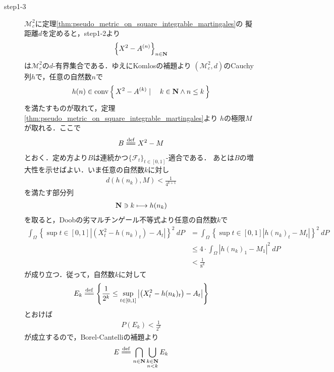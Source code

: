 \begin{sketch}
\begin{description}
			\item[step1-3]
				$\mathscr{M}_{c}^{2}$に定理\ref{thm:pseudo_metric_on_square_integrable_martingales}の
				擬距離$d$を定めると，step1-2より
				\begin{align}
					\left\{X^{2} - A^{(n)}\right\}_{n \in \mathbf{N}}
				\end{align}
				は$\mathscr{M}_{c}^{2}$の$d$-有界集合である．ゆえにKomlosの補題より
				$\left(\mathscr{M}_{c}^{2},d\right)$のCauchy列$h$で，任意の自然数$n$で
				\begin{align}
					h(n) \in \operatorname*{conv} \left\{\, X^{2}-A^{(k)} \mid \quad k \in \mathbf{N} \wedge n \leq k\, \right\}
					\label{fom:thm_decomposition_of_square_integrable_martingales_5}
				\end{align}
				を満たすものが取れて，定理\ref{thm:pseudo_metric_on_square_integrable_martingales}より
				$h$の極限$M$が取れる．ここで
				\begin{align}
					B \defeq X^{2} - M
				\end{align}
				とおく．定め方より$B$は連続かつ$\{\mathscr{F}_t\}_{t \in [0,1]}$-適合である．
				あとは$B$の増大性を示せばよい．いま任意の自然数$k$に対し
				\begin{align}
					d(h(n_k),M) < \frac{1}{4^{k+1}}
				\end{align}
				を満たす部分列
				\begin{align}
					\mathbf{N} \ni k \longmapsto h(n_k)
				\end{align}
				を取ると，Doobの劣マルチンゲール不等式より任意の自然数$k$で
				\begin{align}
					\int_\Omega \left\{\sup{t \in [0,1]}{\left|\left(X^2_t - h(n_k)_t\right) - A_t\right|}\right\}^2\ dP
					&= \int_\Omega \left\{\sup{t \in [0,1]}{\left|h(n_k)_t - M_t\right|}\right\}^2\ dP \\
					&\leq 4 \cdot \int_\Omega \left|h(n_k)_{1} - M_{1}\right|^2\ dP \\
					&< \frac{1}{8^k}
				\end{align}
				が成り立つ．従って，自然数$k$に対して
				\begin{align}
					E_k \defeq \left\{ \frac{1}{2^k} \leq \sup{t \in [0,1]}{\left|\left(X^2_t - h(n_k)_t\right) - A_t\right|} \right\}
				\end{align}
				とおけば
				\begin{align}
					P(E_k) < \frac{1}{2^k}
				\end{align}
				が成立するので，Borel-Cantelliの補題より
				\begin{align}
					E \defeq \bigcap_{n \in \Natural} \bigcup_{\substack{k \in \Natural \\ n < k}} E_k

\end{align}
\end{description}
\end{sketch}
